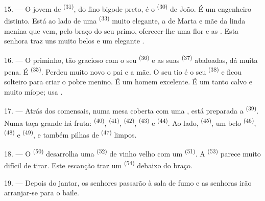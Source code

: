 15. --- O jovem de  \textsuperscript{(31)}, do fino bigode preto, é
o  \textsuperscript{(30)} de João. É um engenheiro distinto. Está
ao lado de uma  \textsuperscript{(33)} muito elegante, a
 de Marta e mãe da linda menina que vem, pelo
braço do seu primo, oferecer-lhe uma flor e  as
. Esta senhora traz uns  muito belos e
um elegante .

16. --- O priminho, tão gracioso com o seu 
\textsuperscript{(36)} e as suas  \textsuperscript{(37)} abaloadas, dá
muita pena. É  \textsuperscript{(35)}. Perdeu muito novo o pai e a
mãe. O seu tio é o seu  \textsuperscript{(38)} e ficou solteiro para
criar o pobre menino. É um homem excelente. É um tanto calvo e muito
míope; usa .

\VUsaut{2.4mm}
\VUsaut{3.0mm}

17. --- Atrás dos comensais, numa mesa coberta com uma ,
está preparada a  \textsuperscript{(39)}. Numa taça grande há
fruta:  \textsuperscript{(40)}, 
\textsuperscript{(41)},  \textsuperscript{(42)}, 
\textsuperscript{(43)} e  \textsuperscript{(44)}. Ao lado,
 \textsuperscript{(45)}, um belo 
\textsuperscript{(46)},  \textsuperscript{(48)} e
 \textsuperscript{(49)}, e também pilhas de 
\textsuperscript{(47)} limpos.

18. --- O  \textsuperscript{(50)} desarrolha uma 
\textsuperscript{(52)} de vinho velho com um 
\textsuperscript{(51)}. A  \textsuperscript{(53)} parece muito difícil de
tirar. Este escanção traz um  \textsuperscript{(54)} debaixo
do braço.

19. --- Depois do jantar, os senhores passarão à sala de fumo e as
senhoras irão arranjar-se para o baile.

\VUsaut{5.0mm}
\VUsaut{1.6mm}
\VUsaut{2.6mm}

\VUsaut{3.0mm}

